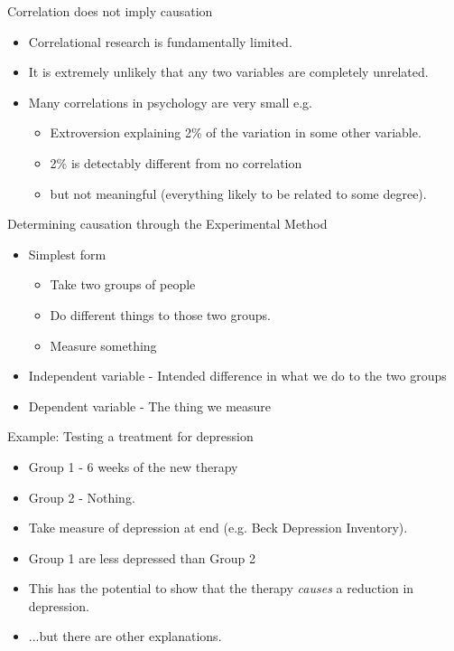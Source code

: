 \documentclass{beamer}
\begin{document}
\begin{frame}{Correlation does not imply causation}
\begin{itemize}
\item Correlational research is fundamentally limited.
\item It is extremely unlikely that any two variables are completely unrelated.
\item Many correlations in psychology are very small e.g.
\begin{itemize}
\item Extroversion explaining 2\% of the variation in some other variable.
\item 2\% is detectably different from no correlation
\item but not meaningful (everything likely to be related to some degree).
\end{itemize}
\end{itemize}
\end{frame}

\begin{frame}{Determining causation through the Experimental Method}
\begin{itemize}
\item Simplest form
\begin{itemize}
\item Take two groups of people
\item Do different things to those two groups.
\item Measure something
\end{itemize}
\vspace{12 pt}
\item Independent variable - Intended difference in what we do to the two groups
\item Dependent variable - The thing we measure
\end{itemize}
\end{frame}

\begin{frame}{Example: Testing a treatment for depression}
\begin{itemize}
\item Group 1 - 6 weeks of the new therapy
\item Group 2 - Nothing.
\item Take measure of depression at end (e.g. Beck Depression Inventory).
\item Group 1 are less depressed than Group 2
\vspace{12 pt}
\item This has the potential to show that the therapy \emph{causes} a reduction in depression.
\item ...but there are other explanations.
\end{itemize}
\end{frame}
\end{document}
